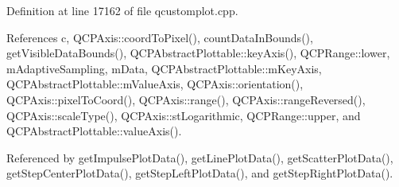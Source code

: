 Definition at line 17162 of file qcustomplot.\+cpp.



References c, Q\+C\+P\+Axis\+::coord\+To\+Pixel(), count\+Data\+In\+Bounds(), get\+Visible\+Data\+Bounds(), Q\+C\+P\+Abstract\+Plottable\+::key\+Axis(), Q\+C\+P\+Range\+::lower, m\+Adaptive\+Sampling, m\+Data, Q\+C\+P\+Abstract\+Plottable\+::m\+Key\+Axis, Q\+C\+P\+Abstract\+Plottable\+::m\+Value\+Axis, Q\+C\+P\+Axis\+::orientation(), Q\+C\+P\+Axis\+::pixel\+To\+Coord(), Q\+C\+P\+Axis\+::range(), Q\+C\+P\+Axis\+::range\+Reversed(), Q\+C\+P\+Axis\+::scale\+Type(), Q\+C\+P\+Axis\+::st\+Logarithmic, Q\+C\+P\+Range\+::upper, and Q\+C\+P\+Abstract\+Plottable\+::value\+Axis().



Referenced by get\+Impulse\+Plot\+Data(), get\+Line\+Plot\+Data(), get\+Scatter\+Plot\+Data(), get\+Step\+Center\+Plot\+Data(), get\+Step\+Left\+Plot\+Data(), and get\+Step\+Right\+Plot\+Data().


